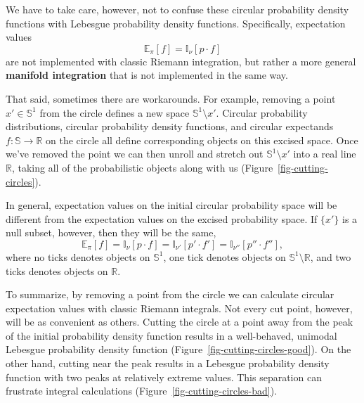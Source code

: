 \documentclass[
  letterpaper,
  DIV=11,
  numbers=noendperiod]{scrartcl}
\begin{document}
We have to take care, however, not to confuse these circular probability
density functions with Lebesgue probability density functions.
Specifically, expectation values \[
\mathbb{E}_{\pi}[f] = \mathbb{I}_{\nu}[p \cdot f]
\] are not implemented with classic Riemann integration, but rather a
more general \textbf{manifold integration} that is not implemented in
the same way.

That said, sometimes there are workarounds. For example, removing a
point \(x' \in \mathbb{S}^{1}\) from the circle defines a new space
\(\mathbb{S}^{1} \setminus x'\). Circular probability distributions,
circular probability density functions, and circular expectands
\(f : \mathbb{S} \rightarrow \mathbb{R}\) on the circle all define
corresponding objects on this excised space. Once we've removed the
point we can then unroll and stretch out \(\mathbb{S}^{1} \setminus x'\)
into a real line \(\mathbb{R}\), taking all of the probabilistic objects
along with us (Figure~\ref{fig-cutting-circles}).

In general, expectation values on the initial circular probability space
will be different from the expectation values on the excised probability
space. If \(\{ x' \}\) is a null subset, however, then they will be the
same, \[
\mathbb{E}_{\pi}[f]
= \mathbb{I}_{\nu}[p \cdot f]
= \mathbb{I}_{\nu'}[p' \cdot f']
= \mathbb{I}_{\nu''}[p'' \cdot f''],
\] where no ticks denotes objects on \(\mathbb{S}^{1}\), one tick
denotes objects on \(\mathbb{S}^{1} \setminus \mathbb{R}\), and two
ticks denotes objects on \(\mathbb{R}\).

To summarize, by removing a point from the circle we can calculate
circular expectation values with classic Riemann integrals. Not every
cut point, however, will be as convenient as others. Cutting the circle
at a point away from the peak of the initial probability density
function results in a well-behaved, unimodal Lebesgue probability
density function (Figure~\ref{fig-cutting-circles-good}). On the other
hand, cutting near the peak results in a Lebesgue probability density
function with two peaks at relatively extreme values. This separation
can frustrate integral calculations
(Figure~\ref{fig-cutting-circles-bad}).
\end{document}
